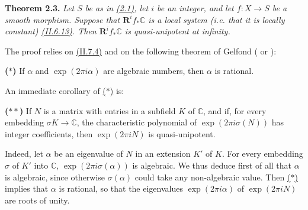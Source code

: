 \documentclass{report}
\newenvironment{itenv}[1]
  {\phantomsection\par\medskip\noindent\textbf{#1.}\itshape}
  {\medskip}
\newenvironment{itenv*}
  {\phantomsection\par\medskip\noindent\itshape}
  {\medskip}
\newcommand{\CC}{\mathbb{C}}
\newcommand{\RR}{\mathbf{R}}
\begin{document}
\begin{itenv}{Theorem 2.3}
\label{III.2.3}
  Let $S$ be as in \hyperref[III.2.1]{(2.1)}, let $i$ be an integer, and let $f\colon X\to S$ be a smooth morphism.
  Suppose that $\RR^if_*\CC$ is a local system (i.e. that it is locally constant) \hyperref[II.6.13]{(II.6.13)}.
  Then $\RR^if_*\CC$ is quasi-unipotent at infinity.
\end{itenv}

The proof relies on \hyperref[II.7.4]{(II.7.4)} and on the following theorem of Gelfond (\cite{6} or \cite{2}):

\begin{itenv*}
\label{III.2.3.*}
  {\rm\textbf{($*$)}}
  If $\alpha$ and $\exp(2\pi i\alpha)$ are algebraic numbers, then $\alpha$ is rational.
\end{itenv*}

An immediate corollary of \hyperref[III.2.3.*]{($*$)} is:

\begin{itenv*}
\label{III.2.3.**}
  {\rm\textbf{($**$)}}
  If $N$ is a matrix with entries in a subfield $K$ of $\CC$, and if, for every embedding $\sigma K\to\CC$, the characteristic polynomial of $\exp(2\pi i\sigma(N))$ has integer coefficients, then $\exp(2\pi iN)$ is quasi-unipotent.
\end{itenv*}

Indeed, let $\alpha$ be an eigenvalue of $N$ in an extension $K'$ of $K$.
For every embedding $\sigma$ of $K'$ into $\CC$, $\exp(2\pi i\sigma(\alpha))$ is algebraic.
We thus deduce first of all that $\alpha$ is algebraic, since otherwise $\sigma(\alpha)$ could take any non-algebraic value.
Then \hyperref[III.2.3.*]{($*$)} implies that $\alpha$ is rational, so that the eigenvalues $\exp(2\pi i\alpha)$ of $\exp(2\pi iN)$ are roots of unity.
\end{document}
